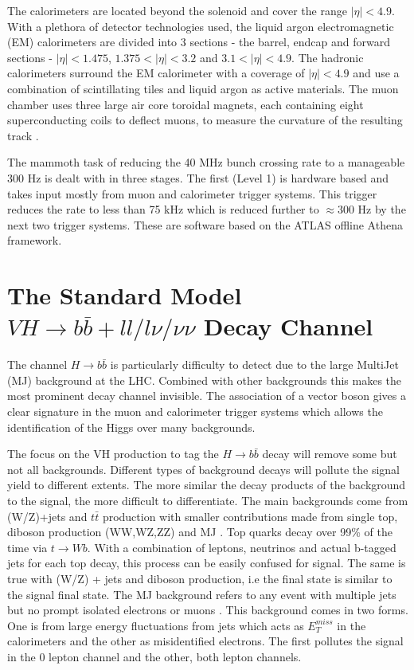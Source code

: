The calorimeters are located beyond the solenoid and cover the range $|\eta| < 4.9 $. With a plethora of detector technologies used, the liquid argon electromagnetic (EM) calorimeters are divided into 3 sections - the barrel, endcap and forward sections - $|\eta| < 1.475 $, $1.375 < |\eta| < 3.2 $  and $3.1 < |\eta| < 4.9$. 
The hadronic calorimeters surround the EM calorimeter with a coverage of $|\eta| < 4.9$ and use a combination of scintillating tiles and liquid argon as active materials. The muon chamber uses three large air core toroidal magnets, each containing eight superconducting coils to deflect muons, to measure the curvature of the resulting track \cite{muoncham}. 

The mammoth task of reducing the 40 MHz bunch crossing rate to a manageable 300 Hz is dealt with in three stages\cite{trigger}. The first (Level 1) is hardware based and takes input mostly from muon and calorimeter trigger systems. This trigger reduces the rate to less than 75 kHz which is reduced further to $\approx$300 Hz by the next two trigger systems. These are software based on the ATLAS offline Athena framework. 



\section{The Standard Model $VH\rightarrow b\bar{b} + ll/l\nu/\nu\nu$ Decay Channel }
\label{decay}
The channel $H\rightarrow b\bar{b}$ is particularly difficulty to detect due to the large MultiJet (MJ) background at the LHC. Combined with other backgrounds this makes the most prominent decay channel invisible. The association of a vector boson gives a clear signature in the muon and calorimeter trigger systems which allows the identification of the Higgs over many backgrounds.  

The focus on the VH production to tag the $H\rightarrow b\bar{b}$ decay will remove some but not all backgrounds. Different types of background decays will pollute the signal yield to different extents. The more similar the decay products of the background to the signal, the more difficult to differentiate. 
The main backgrounds come from (W/Z)+jets and $t\bar{t}$ production with smaller contributions made from single top, diboson production (WW,WZ,ZZ)  and MJ \cite{higgsBB}. Top quarks decay over 99\% of the time via $t\rightarrow W b$. With a combination of leptons, neutrinos and actual b-tagged jets for each top decay, this process can be easily confused for signal. The same is true with (W/Z) + jets and diboson production, i.e the final state is similar to the signal final state. The MJ background refers to any event with multiple jets but no prompt isolated electrons or muons \cite{multijetsusy}. This background comes in two forms. One is from large energy fluctuations from jets which acts as $E_T^{miss}$ in the calorimeters and the other as misidentified electrons. The first pollutes the signal in the 0 lepton channel and the other, both lepton channels.

